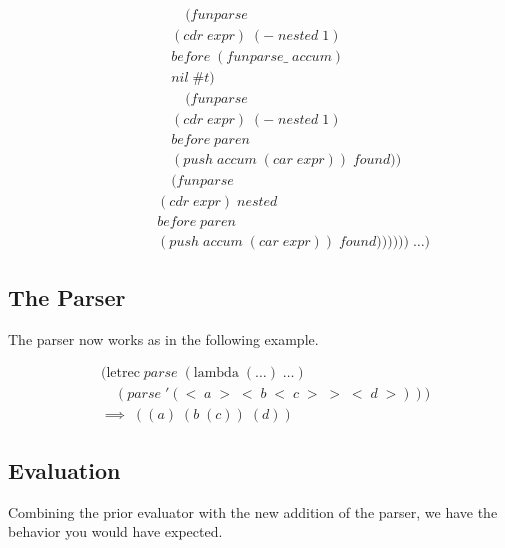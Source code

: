 \begin{align*}
\\& \qquad \qquad \qquad (funparse \; 
\\& \qquad \qquad \quad (cdr \; expr) \; (- \; nested \; 1) \; 
\\& \qquad \qquad \quad before \; (funparse\_ \; accum) \; 
\\& \qquad \qquad \quad nil \; \#t)
\\& \qquad \qquad \qquad (funparse \; 
\\& \qquad \qquad \quad (cdr \; expr) \; (- \; nested \; 1) \; 
\\& \qquad \qquad \quad before \; paren \; 
\\& \qquad \qquad \quad (push \; accum \; (car \; expr)) \; found))
\\& \qquad \qquad \quad (funparse \; 
\\& \qquad \qquad (cdr \; expr) \; nested \; 
\\& \qquad \qquad before \; paren \; 
\\& \qquad \qquad (push \; accum \; (car \; expr)) \; found)))))) \; \dots)
\end{align*}

\subsection{The Parser}
The parser now works as in the following example.

\begin{align*}
& (\text{letrec} \; parse \; (\text{lambda} \; (\dots) \; \dots)
\\& \quad (parse \; '(< \; a \; > \; < \; b \; < \; c \; > \; > \; < \; d \; >)))
\\& \implies \; ((a) \; (b \; (c)) \; (d))
\end{align*}

\subsection{Evaluation}
Combining the prior evaluator with the new addition of the parser, we have the behavior you would have expected.
